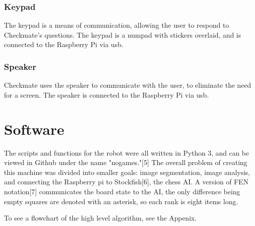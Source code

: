 \documentclass[onecolumn]{IEEEtran}
\begin{document}
\subsubsection{Keypad}
The keypad is a means of communication, allowing the user to respond to Checkmate's questions. The keypad is a numpad with stickers overlaid, and is connected to the Raspberry Pi via usb. 
\subsubsection{Speaker}
Checkmate uses the speaker to communicate with the user, to eliminate the need for a screen. The speaker is connected to the Raspberry Pi via usb. 

\section{Software}
The scripts and functions for the robot were all written in Python 3, and can be viewed in Github under the name "nogames."[5] The overall problem of creating this machine was divided into smaller goals: image segmentation, image analysis, and connecting the Raspberry pi to Stockfish[6], the chess AI. A version of FEN notation[7] communicates the board state to the AI, the only difference being empty squares are denoted with an asterisk, so each rank is eight items long.\par
To see a flowchart of the high level algorithm, see the Appenix.
\end{document}
